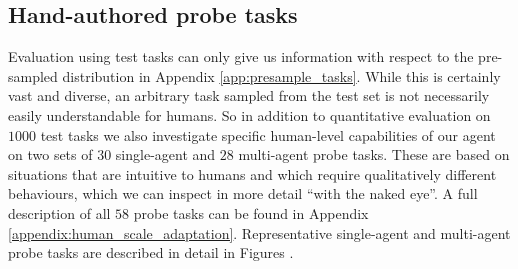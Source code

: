 \documentclass[11pt, a4paper, logo, copyright]{deepmind}
\begin{document}
\begin{appendix}
\subsection{Hand-authored probe tasks}
Evaluation using test tasks can only give us information with respect to the pre-sampled distribution in Appendix \ref{app:presample_tasks}. While this is certainly vast and diverse, an arbitrary task sampled from the test set is not necessarily easily understandable for humans. So in addition to quantitative evaluation on $1000$ test tasks we also investigate specific human-level capabilities of our agent on two sets of $30$ single-agent and $28$ multi-agent probe tasks. These are based on situations that are intuitive to humans and which require qualitatively different behaviours, which we can inspect in more detail ``with the naked eye''. A full description of all $58$ probe tasks can be found in Appendix \ref{appendix:human_scale_adaptation}. Representative single-agent and multi-agent probe tasks are described in detail in Figures .

\end{appendix}
\end{document}
